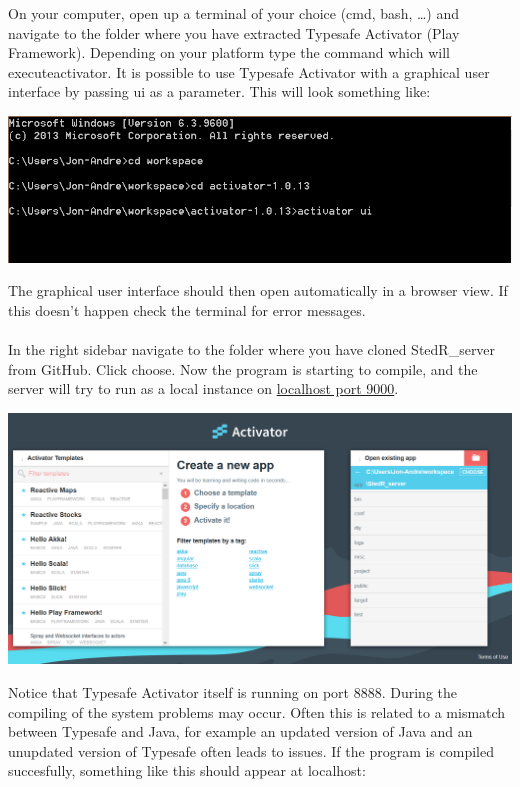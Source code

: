 On your computer, open up a terminal of your choice (cmd, bash, \dots) and navigate to the folder where you have extracted Typesafe Activator (Play Framework). Depending on your platform type the command which will executeactivator. It is possible to use Typesafe Activator with a graphical user interface by passing ui as a parameter. This will look something like:
\begin{center}
\includegraphics[scale=0.8]{guide/activator1.png} 
\end{center}
The graphical user interface should then open automatically in a browser view. If this doesn't happen check the terminal for error messages.

\paragraph{}
In the right sidebar navigate to the folder where you have cloned StedR\_server from GitHub. Click choose. Now the program is starting to compile, and the server will try to run as a local instance on \href{http://127.0.0.1:9000}{localhost port 9000}. 
\begin{center}
\includegraphics[scale=0.4]{guide/activator2.png} 
\end{center}

Notice that Typesafe Activator itself is running on port 8888. During the compiling of the system problems may occur. Often this is related to a mismatch between Typesafe and Java, for example an updated version of Java and an unupdated version of Typesafe often leads to issues. If the program is compiled succesfully, something like this should appear at localhost: 


